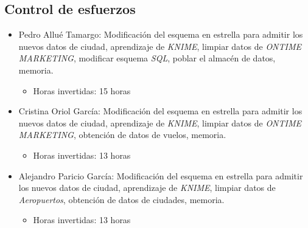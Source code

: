 \documentclass{article}
\begin{document}
\subsection{Control de esfuerzos}
\begin{itemize}
    \item Pedro Allué Tamargo: Modificación del esquema en estrella para admitir los nuevos datos de ciudad, aprendizaje de \textit{KNIME}, limpiar datos de \textit{ONTIME MARKETING}, modificar esquema \textit{SQL}, poblar el almacén de datos, memoria.
        \begin{itemize}
            \item Horas invertidas: 15 horas
        \end{itemize}
    \item Cristina Oriol García: Modificación del esquema en estrella para admitir los nuevos datos de ciudad, aprendizaje de \textit{KNIME}, limpiar datos de \textit{ONTIME MARKETING}, obtención de datos de vuelos, memoria.
        \begin{itemize}
            \item Horas invertidas: 13 horas
        \end{itemize}
    \item Alejandro Paricio García: Modificación del esquema en estrella para admitir los nuevos datos de ciudad, aprendizaje de \textit{KNIME}, limpiar datos de \textit{Aeropuertos}, obtención de datos de ciudades, memoria.
        \begin{itemize}
            \item Horas invertidas: 13 horas
        \end{itemize}
\end{itemize}
\end{document}
